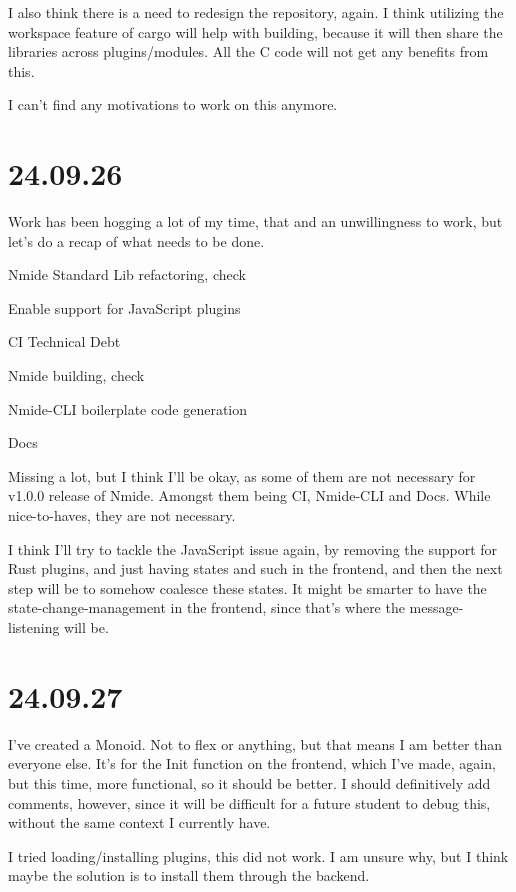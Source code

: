 I also think there is a need to redesign the repository, again. I think
utilizing the workspace feature of cargo will help with building, because it
will then share the libraries across plugins/modules. All the C code will not
get any benefits from this.

I can't find any motivations to work on this anymore.


\section{24.09.26}

Work has been hogging a lot of my time, that and an unwillingness to work, but
let's do a recap of what needs to be done.

\begin{list}
  \item Nmide Standard Lib refactoring, check
  \item Enable support for JavaScript plugins
  \item CI Technical Debt
  \item Nmide building, check
  \item Nmide-CLI boilerplate code generation
  \item Docs
\end{list}

Missing a lot, but I think I'll be okay, as some of them are not necessary for
v1.0.0 release of Nmide. Amongst them being CI, Nmide-CLI and Docs. While
nice-to-haves, they are not necessary.

I think I'll try to tackle the JavaScript issue again, by removing the support
for Rust plugins, and just having states and such in the frontend, and then the
next step will be to somehow coalesce these states. It might be smarter to have
the state-change-management in the frontend, since that's where the
message-listening will be.


\section{24.09.27}

I've created a Monoid. Not to flex or anything, but that means I am better than
everyone else. It's for the Init function on the frontend, which I've made,
again, but this time, more functional, so it should be better. I should
definitively add comments, however, since it will be difficult for a future
student to debug this, without the same context I currently have.

I tried loading/installing plugins, this did not work. I am unsure why, but I
think maybe the solution is to install them through the backend.
